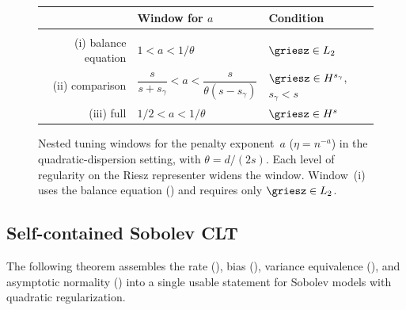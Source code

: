 \documentclass{article}
\begin{document}
\begin{figure}[ht]
\centering
\setlength{\tabcolsep}{4pt}
\renewcommand{\arraystretch}{1.6}
\begin{tabular}{r@{\quad}l@{\quad}l}
& \textbf{Window for $a$} & \textbf{Condition} \\[2pt]
\hline\\[-8pt]
\textup{(i)} balance equation
  & $1 < a < 1/\theta$
  & $\griesz \in L_2$ \\[4pt]
\textup{(ii)} comparison
  & $\dfrac{s}{s+s_\gamma}
    < a <
    \dfrac{s}{\theta(s - s_\gamma)}$
  & $\griesz \in H^{s_\gamma}$, $s_\gamma < s$ \\[6pt]
\textup{(iii)} full
  & $1/2 < a < 1/\theta$
  & $\griesz \in H^s$ \\[2pt]
\end{tabular}
\caption{Nested tuning windows for the penalty exponent~$a$
  ($\eta = n^{-a}$)
  in the quadratic-dispersion setting,
  with $\theta = d/(2s)$.
  Each level of regularity on the Riesz representer
  widens the window.
  Window~\textup{(i)} uses
  the balance equation
  ()
  and requires only $\griesz \in L_2$.}
\label{fig:tuning-windows}
\end{figure}

\subsection{Self-contained Sobolev CLT}
\label{sec:sobolev-clt}

The following theorem assembles
the rate (),
bias (),
variance equivalence (),
and asymptotic normality ()
into a single usable statement
for Sobolev models
with quadratic regularization.
\end{document}
